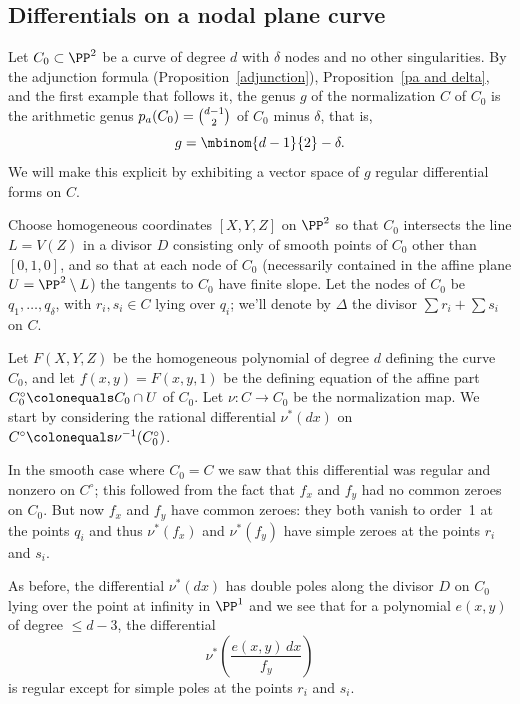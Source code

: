 \subsection{Differentials on a nodal plane curve}\label{canonical series on nodal plane curves}

Let $C_{0} \subset \PP^2$  be a curve of degree $d$ with $\delta$
nodes and no other singularities. By the
adjunction formula
%
%
%
 (Proposition~\ref{adjunction}),
Proposition~\ref{pa and delta}, and the first example that follows it,
the genus $g$ of the normalization $C$ of $C_{0}$ is
the arithmetic genus $p_{a}(C_{0}) = \tbinom{d-1}{2}$
of $C_{0}$ minus $\delta$, that is,
$$
g = \mbinom{d-1}{2} -\delta.
$$
We will make this explicit by
%
%
exhibiting a vector space of $g$ regular differential forms on $C$.

Choose homogeneous coordinates  $[X,Y,Z]$ on $\PP^2$ so that
$C_0$ intersects the line $L = V(Z)$ in a divisor $D$ consisting only
of smooth points of $C_{0}$  other than $[0,1,0]$, and
so that at each node of $C_0$ (necessarily contained in the affine plane $U = \PP^2 \setminus L$) the tangents to $C_0$ have finite slope.
Let the nodes of $C_0$ be $q_1,\dots,q_\delta$, with $r_i, s_i \in C$ lying
over $q_i$; we'll denote by $\Delta$ the divisor $\sum r_i + \sum s_i$ on $C$.

Let $F(X,Y,Z)$ be the homogeneous polynomial of degree $d$ defining
the curve $C_0$, and let $f(x,y) = F(x,y,1)$ be the defining equation
of the affine part $C_{0}^{\circ}\colonequals  C_0 \cap U$ of $C_0$.
Let $\nu: C\to C_0$ be the normalization map. We start by considering
the rational differential
%
$\nu^*(dx)$ on
$C^{\circ}\colonequals  \nu^{-1}(C_{0}^{\circ})$.

In the smooth case where $C_{0}=C$ we saw that this differential was
regular and nonzero on $C^{\circ}$; this followed from the fact
that $f_{x}$ and $f_{y}$ had no common zeroes on $C_0$. But now
$f_{x}$ and $f_{y}$ have common zeroes: they both vanish to order~1 at
the points $q_{i}$ and thus $\nu^*(f_{x})$ and $\nu^*(f_{y})$ have
simple zeroes at the points $r_i$ and $s_i$.

As before, the differential $\nu^*(dx)$
has  double poles along the divisor
$D$ on $C_{0}$ lying over the point at infinity in $\PP^{1}$
and we see that for a polynomial $e(x,y)$ of degree $\leq d-3$, the
differential
$$
\nu^*\left( \frac{e(x,y)\,dx}{f_{y}}\right)
$$
is regular except for simple poles at the points $r_i$ and $s_i$.

